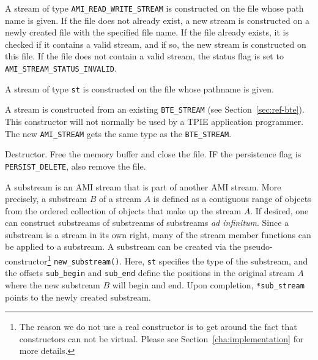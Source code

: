      {A stream of type
    \lstinline|AMI_READ_WRITE_STREAM| is constructed on the file whose path
    name is given. If the file does not already exist, a new stream is
    constructed on a newly created file with the specified file name. If
    the file already exists, it is checked if it contains a valid stream,
    and if so, the new stream is constructed on this file. If the file does
    not contain a valid stream, the status flag is set to
    \lstinline|AMI_STREAM_STATUS_INVALID|.}

     {A
    stream of type \lstinline|st| is constructed on the file whose pathname is
    given.}

     {A stream is constructed from
    an existing \lstinline|BTE_STREAM| (see Section~\ref{sec:ref-bte}). This
    constructor will not normally be used by a TPIE application
    programmer. The new \lstinline|AMI_STREAM| gets the same type as the
    \lstinline|BTE_STREAM|.}

     {Destructor. Free the memory
    buffer and close the file. IF the persistence flag is
    \lstinline|PERSIST_DELETE|, also remove the file.}

    {A substream is an AMI stream that is part of another AMI stream. More
    precisely, a substream $B$ of a stream $A$ is defined as a contiguous
    range of objects from the ordered collection of objects that make up
    the stream $A$.  If desired, one can construct substreams of substreams
    of substreams {\em ad infinitum}. Since a substream is a stream in its
    own right, many of the stream member functions can be applied to a
    substream. A substream can be created via the
    pseudo-constructor\footnote{The reason we do not use a real constructor
    is to get around the fact that constructors can not be virtual.  Please
    see Section~\ref{cha:implementation} for more details.}
    \lstinline|new_substream()|. Here, \lstinline|st| specifies the type of the
    substream, and the offsets \lstinline|sub_begin| and \lstinline|sub_end|
    define the positions in the original stream $A$ where the new substream
    $B$ will begin and end. Upon completion, \lstinline|*sub_stream| points
    to the newly created substream.}
  \etabb

